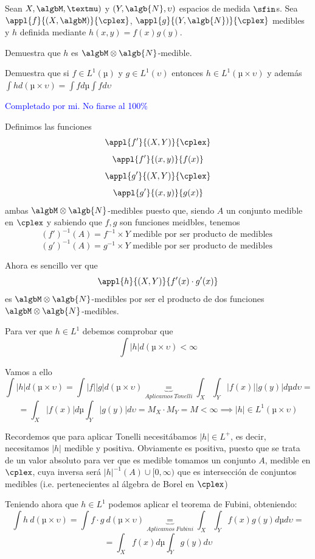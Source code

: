 \begin{problem}[3]
Sean $X, \algbM, µ)$ y $(Y, \algb{N}, \upsilon)$ espacios de medida $\sfin$s. Sea $\appl{f}{(X, \algbM)}{\cplex}$, $\appl{g}{(Y, \algb{N})}{\cplex}$ medibles y $h$ definida mediante $h(x,y)=f(x)g(y)$.

\ppart
Demuestra que $h$ es $\algbM\otimes\algb{N}$-medible.

\ppart
Demuestra que si $f\in L^1(µ)$ y $g \in L^1(\upsilon)$ entonces $h\in L^1(µ \times \upsilon)$ y además $\int hd(µ\times\upsilon)=\int f dµ \int f d\upsilon$

\solution

\textcolor{blue}{Completado por mi. No fiarse al 100\%}

\spart
Definimos las funciones
\[\appl{f'}{(X,Y)}{\cplex}\]
\[\appl{f'}{(x,y)}{f(x)}\]
\[\appl{g'}{(X,Y)}{\cplex}\]
\[\appl{g'}{(x,y)}{g(x)}\]
ambas $\algbM\otimes\algb{N}$-medibles puesto que, siendo $A$ un conjunto medible en $\cplex$ y sabiendo que $f,g$ son funciones meidbles, tenemos
\[(f')^{-1}(A)=f^{-1}\times Y \text{ medible por ser producto de medibles }\]
\[(g')^{-1}(A)=g^{-1}\times Y \text{ medible por ser producto de medibles }\]

Ahora es sencillo ver que
\[\appl{h}{(X,Y)}{f'(x)\cdot g'(x)}\]
es $\algbM\otimes\algb{N}$-medibles por ser el producto de dos funciones $\algbM\otimes\algb{N}$-medibles.


\spart

Para ver que $h\in L^1$ debemos comprobar que
\[\int |h|d(µ\times\upsilon) < \infty\]

Vamos a ello
\[\int |h|d(µ\times\upsilon) = \int |f||g|d(µ\times \upsilon) \underbrace{=}_{Aplicamos \ Tonelli} \int_X\int_Y |f(x)||g(y)| dµ d\upsilon =\]
\[= \int_X |f(x)| dµ \int_Y |g(y)| d \upsilon = M_X \cdot M_Y = M < \infty \implies |h| \in L^1(µ\times \upsilon)\]

Recordemos que para aplicar Tonelli necesitábamos $|h|\in L^+$, es decir, necesitamos $|h|$ medible y positiva. Obviamente es positiva, puesto que se trata de un valor absoluto para ver que es medible tomamos un conjunto $A$, medible en $\cplex$, cuya inversa será $|h|^{-1}(A)\cup[0,\infty)$ que es intersección de conjuntos medibles (i.e. pertenecientes al álgebra de Borel en $\cplex$)

Teniendo ahora que $h\in L^1$ podemos aplicar el teorema de Fubini, obteniendo:
\[\int h \ d(µ\times\upsilon) = \int f\cdot g \ d(µ\times \upsilon) \underbrace{=}_{Aplicamos \ Fubini} \int_X\int_Y f(x)g(y) dµ d\upsilon =\]
\[= \int_X f(x) dµ \int_Y g(y) d \upsilon \]
\end{problem}

